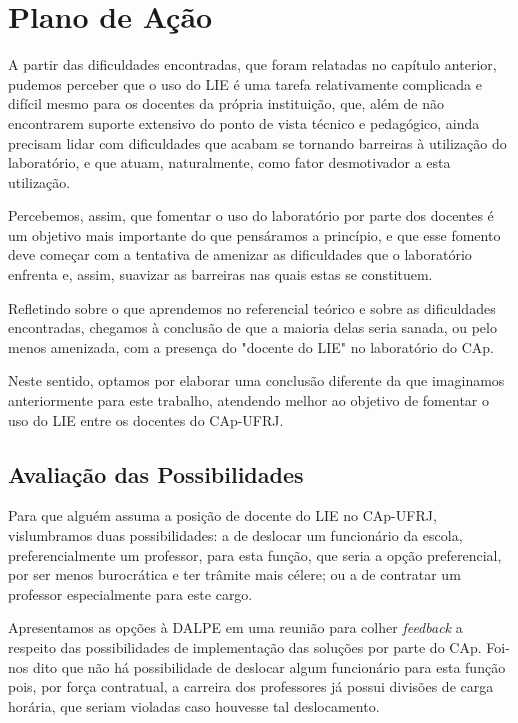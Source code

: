 \chapter{Plano de Ação}\label{chp:LABEL_CHP_CONC}


A partir das dificuldades encontradas, que foram relatadas no capítulo anterior, pudemos perceber que o uso do LIE é uma tarefa relativamente complicada e difícil mesmo para os docentes da própria instituição, que, além de não encontrarem suporte extensivo do ponto de vista técnico e pedagógico, ainda precisam lidar com dificuldades que acabam se tornando barreiras à utilização do laboratório, e que atuam, naturalmente, como fator desmotivador a esta utilização.

Percebemos, assim, que fomentar o uso do laboratório por parte dos docentes é um objetivo mais importante do que pensáramos a princípio, e que esse fomento deve começar com a tentativa de amenizar as dificuldades que o laboratório enfrenta e, assim, suavizar as barreiras nas quais estas se constituem.

Refletindo sobre o que aprendemos no referencial teórico e sobre as dificuldades encontradas, chegamos à conclusão de que a maioria delas seria sanada, ou pelo menos amenizada, com a presença do "docente do LIE" no laboratório do CAp.

Neste sentido, optamos por elaborar uma conclusão diferente da que imaginamos anteriormente para este trabalho, atendendo melhor ao objetivo de fomentar o uso do LIE entre os docentes do CAp-UFRJ.

\section{Avaliação das Possibilidades}\label{chp:LABEL_CHP_CONC_SEC_POSS}

Para que alguém assuma a posição de docente do LIE no CAp-UFRJ, vislumbramos duas possibilidades: a de deslocar um funcionário da escola, preferencialmente um professor, para esta função, que seria a opção preferencial, por ser menos burocrática e ter trâmite mais célere; ou a de contratar um professor especialmente para este cargo.

Apresentamos as opções à DALPE em uma reunião para colher \textit{feedback} a respeito das possibilidades de implementação das soluções por parte do CAp. Foi-nos dito que não há possibilidade de deslocar algum funcionário para esta função pois, por força contratual, a carreira dos professores já possui divisões de carga horária, que seriam violadas caso houvesse tal deslocamento.

